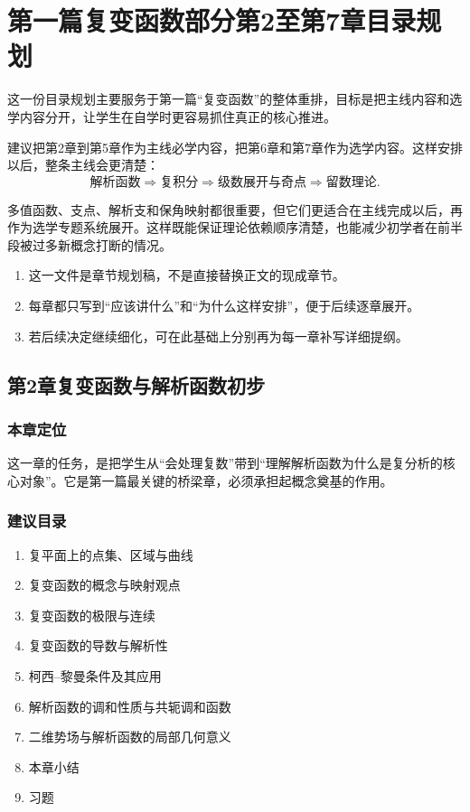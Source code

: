 
\chapter*{第一篇复变函数部分第2至第7章目录规划}

\begin{wulibj}[目录设计的总体思路]
这一份目录规划主要服务于第一篇``复变函数''的整体重排，目标是把主线内容和选学内容分开，让学生在自学时更容易抓住真正的核心推进。

建议把第2章到第5章作为主线必学内容，把第6章和第7章作为选学内容。这样安排以后，整条主线会更清楚：
\[
    \text{解析函数} \Longrightarrow \text{复积分} \Longrightarrow \text{级数展开与奇点} \Longrightarrow \text{留数理论}.
\]

多值函数、支点、解析支和保角映射都很重要，但它们更适合在主线完成以后，再作为选学专题系统展开。这样既能保证理论依赖顺序清楚，也能减少初学者在前半段被过多新概念打断的情况。
\end{wulibj}

\begin{tishi}[使用建议]
\begin{enumerate}
    \item 这一文件是章节规划稿，不是直接替换正文的现成章节。
    \item 每章都只写到``应该讲什么''和``为什么这样安排''，便于后续逐章展开。
    \item 若后续决定继续细化，可在此基础上分别再为每一章补写详细提纲。
\end{enumerate}
\end{tishi}

\section*{第2章\quad 复变函数与解析函数初步}

\subsection*{本章定位}
这一章的任务，是把学生从``会处理复数''带到``理解解析函数为什么是复分析的核心对象''。它是第一篇最关键的桥梁章，必须承担起概念奠基的作用。

\subsection*{建议目录}
\begin{enumerate}
    \item 复平面上的点集、区域与曲线
    \item 复变函数的概念与映射观点
    \item 复变函数的极限与连续
    \item 复变函数的导数与解析性
    \item 柯西--黎曼条件及其应用
    \item 解析函数的调和性质与共轭调和函数
    \item 二维势场与解析函数的局部几何意义
    \item 本章小结
    \item 习题
\end{enumerate}

